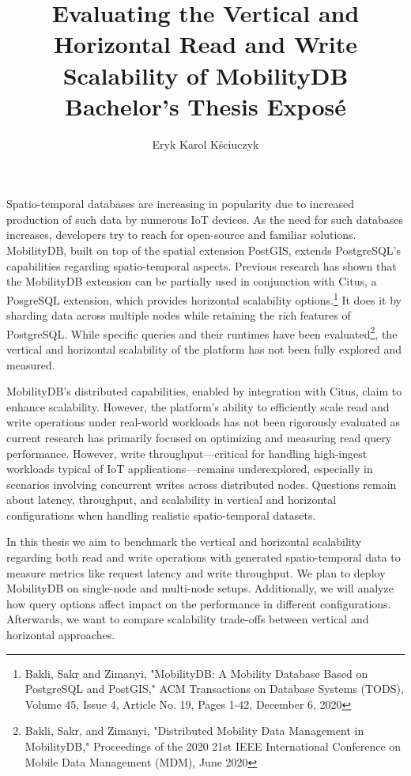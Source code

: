 \documentclass{article}
\title{
	Evaluating the Vertical and Horizontal Read and Write Scalability of 
	MobilityDB
	\\[1ex] \large Bachelor's Thesis Exposé}
\author{Eryk Karol Kściuczyk}
\date{} %
\begin{document}
\maketitle


Spatio-temporal databases are increasing in popularity due to increased
production of such data by numerous IoT devices.
As the need for such databases increases, developers try to reach for 
open-source and familiar solutions.
MobilityDB, built on top of the spatial extension PostGIS, extends PostgreSQL's 
capabilities regarding spatio-temporal aspects.
Previous research has shown that the MobilityDB extension can be partially used
in conjunction with Citus, a PosgreSQL extension, which provides horizontal
scalability options.\footnote{
Bakli, Sakr and Zimanyi, "MobilityDB: A Mobility Database Based on PostgreSQL 
and PostGIS," ACM Transactions on Database Systems (TODS), Volume 45, Issue 4, 
Article No. 19, Pages 1-42, December 6, 2020
}
It does it by sharding data across multiple nodes while retaining the rich
features of PostgreSQL. While specific queries and their runtimes have been 
evaluated\footnote{
Bakli, Sakr, and Zimanyi, "Distributed Mobility Data Management in MobilityDB," 
Proceedings of the 2020 21st IEEE International Conference on Mobile Data
Management (MDM), June 2020
},
the vertical and horizontal scalability of the platform has not been fully
explored and measured.

MobilityDB's distributed capabilities, enabled by integration with Citus, claim
to enhance scalability.
However, the platform's ability to efficiently scale read and write operations
under real-world workloads has not been rigorously evaluated as current research
has primarily focused on optimizing and measuring read query performance.
However, write throughput—critical for handling high-ingest workloads typical 
of IoT applications—remains underexplored, especially in scenarios involving
concurrent writes across distributed nodes.
Questions remain about latency, throughput, and scalability in vertical and
horizontal configurations when handling realistic spatio-temporal datasets.

In this thesis we aim to benchmark the vertical and horizontal scalability
regarding both read and write operations with generated spatio-temporal data to
measure metrics like request latency and write throughput.
We plan to deploy MobilityDB on single-node and multi-node setups.
Additionally, we will analyze how query options affect impact on the performance
in different configurations.
Afterwards, we want to compare scalability trade-offs between vertical and
horizontal approaches.
\end{document}
